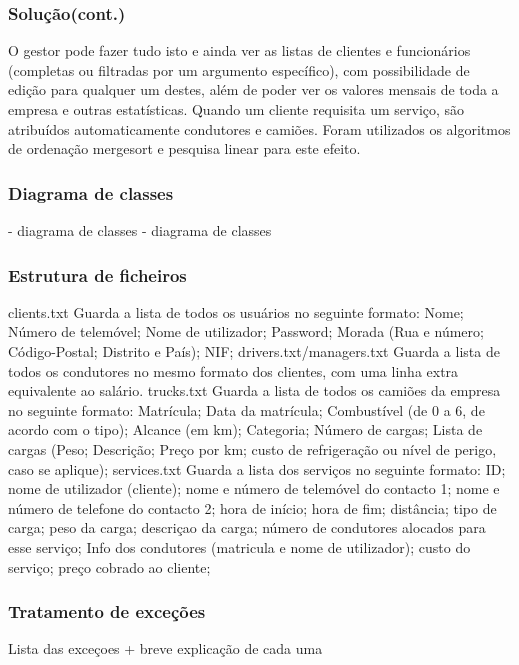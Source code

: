 \documentclass{beamer}
\def\\{}
\begin{document}
\begin{frame}
\frametitle{Solução(cont.)}

O gestor pode fazer tudo isto e ainda ver as listas de clientes e funcionários (completas ou filtradas por um argumento específico), com possibilidade de edição para qualquer um destes, além de poder ver os valores mensais de toda a empresa e outras estatísticas.\\
Quando um cliente requisita um serviço, são atribuídos automaticamente condutores e camiões.
Foram utilizados os algoritmos de ordenação mergesort e pesquisa linear para este efeito.
\end{frame}

\begin{frame}
\frametitle{Diagrama de classes}


- diagrama de classes
- diagrama de classes
\end{frame}

\begin{frame}
\frametitle{Estrutura de ficheiros}
clients.txt\\
Guarda a lista de todos os usuários no seguinte formato: Nome; Número de telemóvel; Nome de utilizador; Password; Morada (Rua e número; Código-Postal; Distrito e País); NIF;\\
drivers.txt/managers.txt\\
Guarda a lista de todos os condutores no mesmo formato dos clientes, com uma linha extra equivalente ao salário.
trucks.txt\\
Guarda a lista de todos os camiões da empresa no seguinte formato: Matrícula; Data da matrícula; Combustível (de 0 a 6, de acordo com o tipo); Alcance (em km); Categoria; Número de cargas; Lista de cargas (Peso; Descrição; Preço por km; custo de refrigeração ou nível de perigo, caso se aplique);\\
services.txt\\
Guarda a lista dos serviços no seguinte formato: ID; nome de utilizador (cliente); nome e número de telemóvel do contacto 1; nome e número de telefone do contacto 2; hora de início; hora de fim; distância; tipo de carga; peso da carga; descriçao da carga; número de condutores alocados para esse serviço; Info dos condutores (matricula e nome de utilizador); custo do serviço; preço cobrado ao cliente;
\end{frame}
 
\begin{frame}
\frametitle{Tratamento de exceções}
Lista das exceçoes + breve explicação de cada uma
\end{frame}
\end{document}
